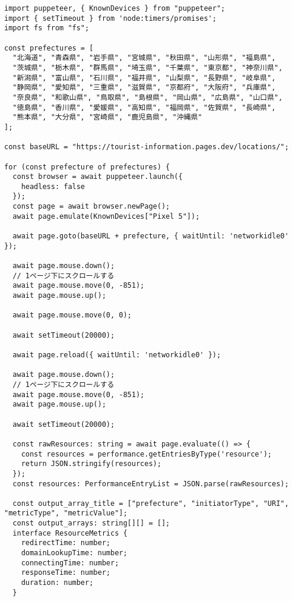 \begin{lstlisting}[caption={PuppeteerとResource Timing APIを用いたスクロール時の画像の読み込み時間の計測},label={lst:PuppeteerとResource Timing APIを用いたスクロール時の画像の読み込み時間の計測}]
import puppeteer, { KnownDevices } from "puppeteer";
import { setTimeout } from 'node:timers/promises';
import fs from "fs";

const prefectures = [
  "北海道", "青森県", "岩手県", "宮城県", "秋田県", "山形県", "福島県",
  "茨城県", "栃木県", "群馬県", "埼玉県", "千葉県", "東京都", "神奈川県",
  "新潟県", "富山県", "石川県", "福井県", "山梨県", "長野県", "岐阜県",
  "静岡県", "愛知県", "三重県", "滋賀県", "京都府", "大阪府", "兵庫県",
  "奈良県", "和歌山県", "鳥取県", "島根県", "岡山県", "広島県", "山口県",
  "徳島県", "香川県", "愛媛県", "高知県", "福岡県", "佐賀県", "長崎県",
  "熊本県", "大分県", "宮崎県", "鹿児島県", "沖縄県"
];

const baseURL = "https://tourist-information.pages.dev/locations/";

for (const prefecture of prefectures) {
  const browser = await puppeteer.launch({
    headless: false
  });
  const page = await browser.newPage();
  await page.emulate(KnownDevices["Pixel 5"]);

  await page.goto(baseURL + prefecture, { waitUntil: 'networkidle0' });

  await page.mouse.down();
  // 1ページ下にスクロールする
  await page.mouse.move(0, -851);
  await page.mouse.up();

  await page.mouse.move(0, 0);

  await setTimeout(20000);

  await page.reload({ waitUntil: 'networkidle0' });

  await page.mouse.down();
  // 1ページ下にスクロールする
  await page.mouse.move(0, -851);
  await page.mouse.up();

  await setTimeout(20000);

  const rawResources: string = await page.evaluate(() => {
    const resources = performance.getEntriesByType('resource');
    return JSON.stringify(resources);
  });
  const resources: PerformanceEntryList = JSON.parse(rawResources);

  const output_array_title = ["prefecture", "initiatorType", "URI", "metricType", "metricValue"];
  const output_arrays: string[][] = [];
  interface ResourceMetrics {
    redirectTime: number;
    domainLookupTime: number;
    connectingTime: number;
    responseTime: number;
    duration: number;
  }


\end{lstlisting}
